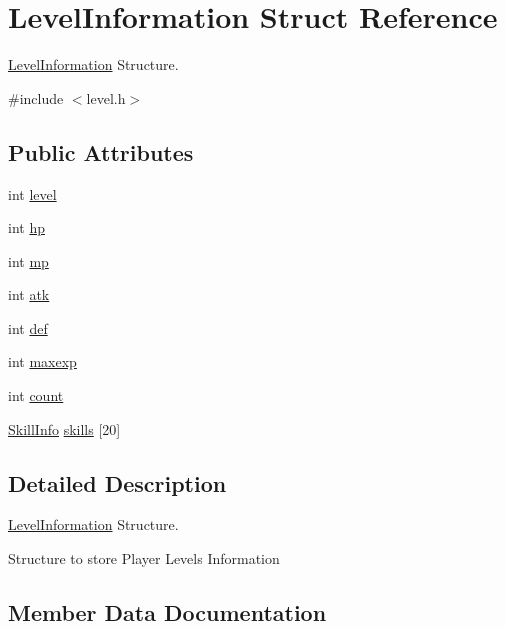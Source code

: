 \hypertarget{structLevelInformation}{}\section{Level\+Information Struct Reference}
\label{structLevelInformation}


\hyperlink{structLevelInformation}{Level\+Information} Structure.  




{\ttfamily \#include $<$level.\+h$>$}

\subsection*{Public Attributes}
\begin{DoxyCompactItemize}
\item 
int \hyperlink{structLevelInformation_a832b8779b23b66a08fcb2c45130e7030}{level}
\item 
int \hyperlink{structLevelInformation_ab99184c0f4610881bb6b588d680d2dec}{hp}
\item 
int \hyperlink{structLevelInformation_ab2707ea8a438f56f90f16ecbc93a50f9}{mp}
\item 
int \hyperlink{structLevelInformation_a34c454f53e956b48710cb1599638f6af}{atk}
\item 
int \hyperlink{structLevelInformation_ac8c99bfa1b9249fa5ea0f00210139876}{def}
\item 
int \hyperlink{structLevelInformation_a7cb8d2c6f5dd41106ad1e181ce2ab50c}{maxexp}
\item 
int \hyperlink{structLevelInformation_acd3b47d2e3da819cec0d7a150ad2c31f}{count}
\item 
\hyperlink{skill_8h_aa7a27dc845bcc95c786a871b170bf850}{Skill\+Info} \hyperlink{structLevelInformation_a7bc26887f1f51f648d55966480470349}{skills} \mbox{[}20\mbox{]}
\end{DoxyCompactItemize}


\subsection{Detailed Description}
\hyperlink{structLevelInformation}{Level\+Information} Structure. 

Structure to store Player Level\textquotesingle{}s Information 

\subsection{Member Data Documentation}
\mbox{\label{structLevelInformation_a34c454f53e956b48710cb1599638f6af}} 
